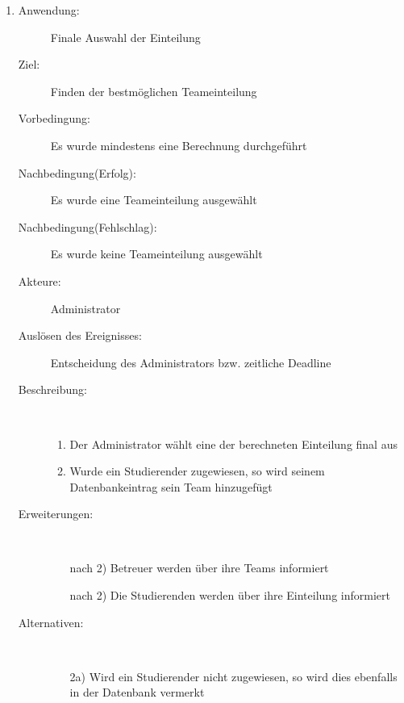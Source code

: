 \documentclass[parskip=full]{scrartcl}
\newcommand{\swtLabel}[1]{\textbf{\textbackslash #1\arabic*0\textbackslash}}
\begin{document}
\begin{enumerate} [label=\swtLabel{A}]
  
  \item
  \begin{description}
  \item[Anwendung:] Finale Auswahl der Einteilung
  \item[Ziel:] Finden der bestmöglichen Teameinteilung
  	\item[Vorbedingung:] Es wurde mindestens eine Berechnung durchgeführt
  	\item[Nachbedingung(Erfolg):] Es wurde eine Teameinteilung ausgewählt
  	\item[Nachbedingung(Fehlschlag):] Es wurde keine Teameinteilung ausgewählt
  	\item[Akteure:] Administrator
  	\item[Auslösen des Ereignisses:] Entscheidung des Administrators bzw.
  	zeitliche Deadline
  	\item[Beschreibung:]~
  	\begin{enumerate} 
  	  \item Der Administrator wählt eine der berechneten Einteilung final aus
  	  \item Wurde ein Studierender zugewiesen, so wird seinem Datenbankeintrag
  	  sein Team hinzugefügt
  	\end{enumerate}
  	\item[Erweiterungen:]~
  	\begin{enumerate}
  	  \item[nach 2)] Betreuer werden über ihre Teams informiert
  	  \item[nach 2)] Die Studierenden werden über ihre Einteilung informiert
  	 \end{enumerate}
  	\item[Alternativen:] ~
  	\begin{enumerate}
  	  \item[2a)] Wird ein Studierender nicht zugewiesen, so wird dies ebenfalls
  	  in der Datenbank vermerkt
  	 \end{enumerate}  
  \end{description}
   

\end{enumerate}
\end{document}
